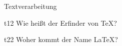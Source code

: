 \documentclass[kalsg]{teacher}
\begin{document}
  \begin{aufgabe}{Textverarbeitung}
     \begin{teilaufgabe}{t}{1}{2}
        Wie heißt der Erfinder von \TeX?
     \end{teilaufgabe}
     \begin{teilaufgabe}{t}{2}{2}
        Woher kommt der Name \LaTeX?
     \end{teilaufgabe}
  \end{aufgabe}
\end{document}
